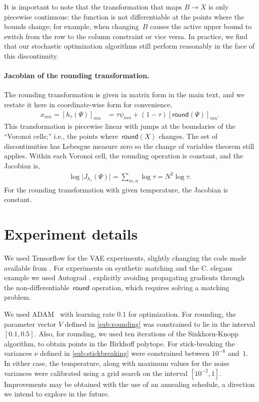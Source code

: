 It is important to note that the transformation that maps
$B \rightarrow X$ is only piecewise continuous: the function is not
differentiable at the points where the bounds change; for example,
when changing~$B$ causes the active upper bound to switch from the row
to the column constraint or vice versa.  In practice, we find
that our stochastic optimization algorithms still perform reasonably
in the face of this discontinuity.


\paragraph{Jacobian of the rounding transformation.}
The rounding transformation is given in matrix form
in the main text, and we restate it here in coordinate-wise form
for convenience,
\begin{align*}
  x_{mn} = [h_\tau(\Psi)]_{mn} &= \tau \psi_{mn} + (1-\tau) [\mathsf{round}(\Psi)]_{mn}.
\end{align*}
This transformation is piecewise linear with jumps at the boundaries
of the ``Voronoi cells;'' i.e., the points where~$\mathsf{round}(X)$
changes. The set of discontinuities has Lebesgue measure zero so the
change of variables theorem still applies.  Within each Voronoi cell,
the rounding operation is constant, and the Jacobian is,
\begin{align*}
  \log \big| J_{h_\tau}(\Psi) \big| = \sum_{m,n} \log \tau = N^2 \log \tau.
\end{align*}
For the rounding transformation with given temperature, the Jacobian
is constant.




\section{Experiment details}
We used Tensorflow \citep{Abadi2016} for the VAE experiments, slightly
changing the code made available from \cite{jang2016categorical}. For
experiments on synthetic matching and the C. elegans example we used
Autograd \citep{maclaurin2015autograd}, explicitly avoiding
propagating gradients through the non-differentiable~$\mathsf{round}$
operation, which requires solving a matching problem.

We used ADAM~\citep{kingma2014adam} with learning rate 0.1 for
optimization. For rounding, the parameter vector $V$ defined in
\ref{sub:rounding} was constrained to lie in the interval
$[0.1, 0.5]$. Also, for rounding, we used ten iterations of the
Sinkhorn-Knopp algorithm, to obtain points in the Birkhoff
polytope. For stick-breaking the variances $\nu$ defined in
\ref{sub:stickbreaking} were constrained between $10^{-8}$ and~$1$. In
either case, the temperature, along with maximum values for the noise
variances were calibrated using a grid search on the interval $[10^{-2},1]$. Improvements may be obtained with the use of an annealing schedule, a direction we intend to explore in the future.
 
